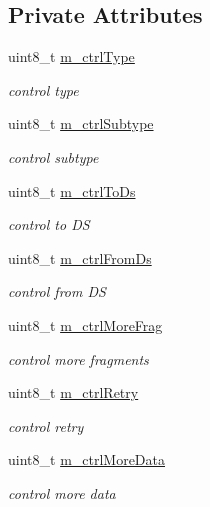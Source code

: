 \subsection*{Private Attributes}
\begin{DoxyCompactItemize}
\item 
uint8\+\_\+t \hyperlink{classns3_1_1WifiMacHeader_ab52a154d49008400f121527257e195c6}{m\+\_\+ctrl\+Type}
\begin{DoxyCompactList}\small\item\em control type \end{DoxyCompactList}\item 
uint8\+\_\+t \hyperlink{classns3_1_1WifiMacHeader_a512ea2949efb1e5f69b8ea9165441f7d}{m\+\_\+ctrl\+Subtype}
\begin{DoxyCompactList}\small\item\em control subtype \end{DoxyCompactList}\item 
uint8\+\_\+t \hyperlink{classns3_1_1WifiMacHeader_af67f68e704e3f42e72febc23df5aceb9}{m\+\_\+ctrl\+To\+Ds}
\begin{DoxyCompactList}\small\item\em control to DS \end{DoxyCompactList}\item 
uint8\+\_\+t \hyperlink{classns3_1_1WifiMacHeader_a79823b56ff5dc9e5f65db3a712be83eb}{m\+\_\+ctrl\+From\+Ds}
\begin{DoxyCompactList}\small\item\em control from DS \end{DoxyCompactList}\item 
uint8\+\_\+t \hyperlink{classns3_1_1WifiMacHeader_ae28621d3a24ef654c60177661f0118aa}{m\+\_\+ctrl\+More\+Frag}
\begin{DoxyCompactList}\small\item\em control more fragments \end{DoxyCompactList}\item 
uint8\+\_\+t \hyperlink{classns3_1_1WifiMacHeader_a0667d92e1b78c852cc55fe1f4342d6c9}{m\+\_\+ctrl\+Retry}
\begin{DoxyCompactList}\small\item\em control retry \end{DoxyCompactList}\item 
uint8\+\_\+t \hyperlink{classns3_1_1WifiMacHeader_a9535838e3b645c3c9cf3c73aa5330309}{m\+\_\+ctrl\+More\+Data}
\begin{DoxyCompactList}\small\item\em control more data \end{DoxyCompactList}\item 

\end{DoxyCompactItemize}
